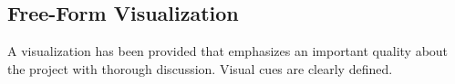 \subsection{Free-Form Visualization}
A visualization has been provided that emphasizes an important quality about the project with thorough discussion. Visual cues are clearly defined.
